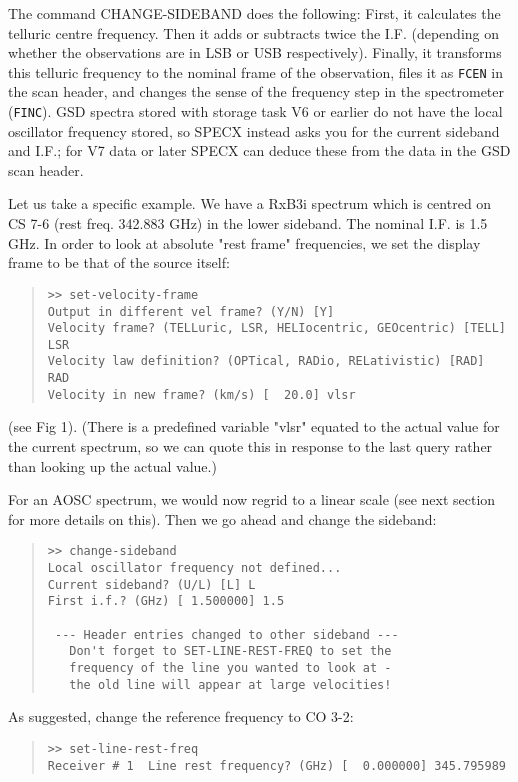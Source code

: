 \documentclass[twoside,11pt]{article}
\renewcommand{\_}{\texttt{\symbol{95}}}
\newenvironment{myquote}{\begin{quote}\begin{small}}{\end{small}\end{quote}}
\begin{document}
The command CHANGE-SIDEBAND does the following: First, it calculates the
telluric centre frequency. Then it adds or subtracts twice the I.F. (depending
on whether the observations are in LSB or USB respectively). Finally, it
transforms this telluric frequency to the nominal frame of the observation,
files it as \texttt{F\_CEN} in the scan header, and changes the sense of the
frequency step in the spectrometer (\texttt{F\_INC}). GSD spectra stored with
storage task V6 or earlier do not have the local oscillator frequency stored,
so SPECX instead asks you for the current sideband and I.F.; for V7 data or
later SPECX can deduce these from the data in the GSD scan header.

Let us take a specific example. We have a RxB3i spectrum which is centred on CS
7-6 (rest freq. 342.883 GHz) in the lower sideband.  The nominal I.F. is 1.5
GHz. In order to look at absolute "rest frame" frequencies, we set the display
frame to be that of the source itself: 

\begin{myquote}
\begin{verbatim}
>> set-velocity-frame
Output in different vel frame? (Y/N) [Y] 
Velocity frame? (TELLuric, LSR, HELIocentric, GEOcentric) [TELL] LSR
Velocity law definition? (OPTical, RADio, RELativistic) [RAD] RAD
Velocity in new frame? (km/s) [  20.0] vlsr
\end{verbatim}
\end{myquote}
(see Fig 1). (There is a predefined variable "vlsr" equated to the actual value
for the current spectrum, so we can quote this in response to the last query
rather than looking up the actual value.) 

For an AOSC spectrum, we would now regrid to a linear scale (see next section
for more details on this). Then we go ahead and change the sideband:
\begin{myquote}
\begin{verbatim}
>> change-sideband
Local oscillator frequency not defined...
Current sideband? (U/L) [L] L
First i.f.? (GHz) [ 1.500000] 1.5

 --- Header entries changed to other sideband ---
   Don't forget to SET-LINE-REST-FREQ to set the
   frequency of the line you wanted to look at -
   the old line will appear at large velocities!
\end{verbatim}
\end{myquote}

As suggested, change the reference frequency to CO 3-2:
\begin{myquote}
\begin{verbatim}
>> set-line-rest-freq
Receiver # 1  Line rest frequency? (GHz) [  0.000000] 345.795989
\end{verbatim}
\end{myquote}
\end{document}
